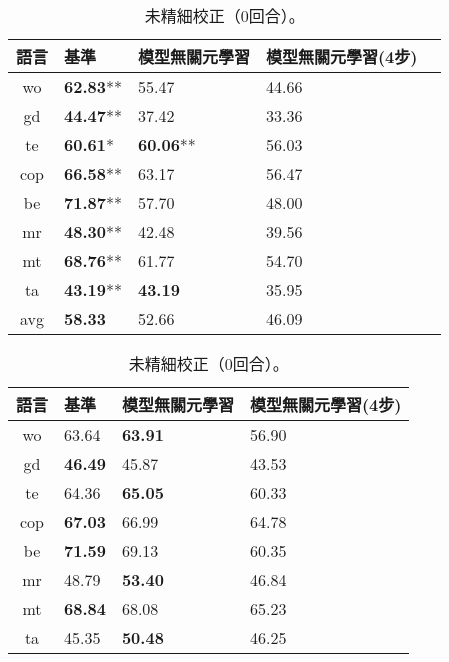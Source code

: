 \begin{table}[htbp]
    \begin{subtable}[h]{0.8\textwidth}
        \centering
            \begin{tabular}[!ht]{c|llll}
                \hline
                語言 & 基準 & 模型無關元學習 & 模型無關元學習(4步) \\
                \hline\hline
                wo & \textbf{62.83}** & 55.47 & 44.66 \\
                gd & \textbf{44.47}** & 37.42 & 33.36 \\
                te & \textbf{60.61}* & \textbf{60.06}** & 56.03 \\
                cop & \textbf{66.58}** & 63.17 & 56.47 \\
                be & \textbf{71.87}** & 57.70 & 48.00 \\
                mr & \textbf{48.30}** & 42.48 & 39.56 \\
                mt & \textbf{68.76}** & 61.77 & 54.70 \\
                ta & \textbf{43.19}** & \textbf{43.19} & 35.95 \\
                \hline
                avg & \textbf{58.33} & 52.66 & 46.09 \\
                \hline
            \end{tabular}
            \caption{未精細校正（0回合）。}
    \end{subtable}
    \vfill
    \begin{subtable}[h]{0.8\textwidth}
        \centering
            \begin{tabular}[!ht]{c|lll}
                \hline
                語言 & 基準 & 模型無關元學習 & 模型無關元學習(4步) \\
                \hline\hline
                wo & 63.64 & \textbf{63.91} & 56.90 \\
                gd & \textbf{46.49} & 45.87 & 43.53 \\
                te & 64.36 & \textbf{65.05} & 60.33 \\
                cop & \textbf{67.03} & 66.99 & 64.78 \\
                be & \textbf{71.59} & 69.13 & 60.35 \\
                mr & 48.79 & \textbf{53.40} & 46.84 \\
                mt & \textbf{68.84} & 68.08 & 65.23 \\
                ta & 45.35 & \textbf{50.48} & 46.25 \\

\end{tabular}
\end{subtable}
\end{table}
